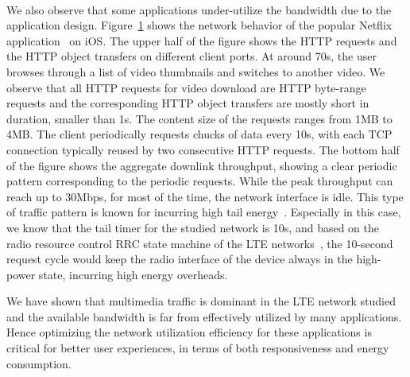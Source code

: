 \begin{figure}[t]
\centering
{}\\
\label{fig:netflix}
\end{figure}

We also observe that some applications under-utilize the bandwidth due to the application design. Figure~\ref{fig:netflix} shows the network behavior of the popular Netflix application~\cite{netflix} on iOS. The upper half of the figure shows the HTTP requests and the HTTP object transfers on different client ports. At around 70s, the user browses through a list of video thumbnails and switches to another video. We observe that all HTTP requests for video download are HTTP byte-range requests and the corresponding HTTP object transfers are mostly short in duration, \ie smaller than 1s. The content size of the requests ranges from 1MB to 4MB. The client periodically requests chucks of data every 10s, with each TCP connection typically reused by two consecutive HTTP requests. The bottom half of the figure shows the aggregate downlink throughput, showing a clear periodic pattern corresponding to the periodic requests. While the peak throughput can reach up to 30Mbps, for most of the time, the network interface is idle. This type of traffic pattern is known for incurring high tail energy~\cite{qian12_www}. Especially in this case, we know that the tail timer for the studied network is 10s, and based on the radio resource control RRC state machine of the LTE networks~\cite{huang_mobisys12}, the 10-second request cycle would keep the radio interface of the device always in the high-power state, incurring high energy overheads.

\label{sec:discussion}

We have shown that multimedia traffic is dominant in the LTE network studied and the available bandwidth is far from effectively utilized by many applications. Hence optimizing the network utilization efficiency for these applications is critical for better user experiences, in terms of both responsiveness and energy consumption.

